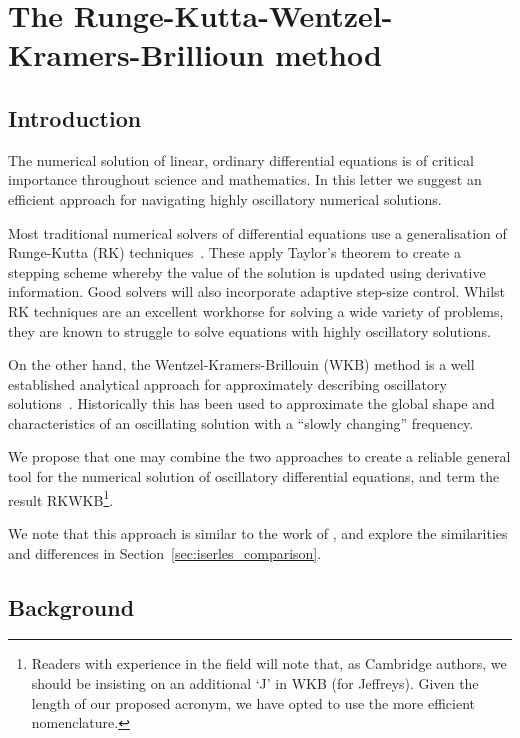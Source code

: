 

\chapter[RKWKB]{The Runge-Kutta-Wentzel-Kramers-Brillioun method}
\label{chap:RK}

\section{Introduction}
\label{sec:introduction}
The numerical solution of linear, ordinary differential equations is of critical importance throughout science and mathematics. In this letter we suggest an efficient approach for navigating highly oscillatory numerical solutions.

Most traditional numerical solvers of differential equations use a generalisation of Runge-Kutta (RK) techniques~\citep{Press+2007}. These apply Taylor's theorem to create a stepping scheme whereby the value of the solution is updated using derivative information. Good solvers will also incorporate adaptive step-size control.
Whilst RK techniques are an excellent workhorse for solving a wide variety of problems, they are known to struggle to solve equations with highly oscillatory solutions.

On the other hand, the Wentzel-Kramers-Brillouin (WKB) method is a well established analytical approach for approximately describing oscillatory solutions~\citep{RHB,Bender+2010}. Historically this has been used to approximate the global shape and characteristics of an oscillating solution with a ``slowly changing'' frequency.

We propose that one may combine the two approaches to create a reliable general tool for the numerical solution of oscillatory differential equations, and term the result RKWKB\footnote{Readers with experience in the field will note that, as Cambridge authors, we should be insisting on an additional `J' in WKB (for Jeffreys). Given the length of our proposed acronym, we have opted to use the more efficient nomenclature.}.

We note that this approach is similar to the work of \cite{Iserles02globalerror,Iserles01thinkglobally}, and explore the similarities and differences in Section~\ref{sec:iserles_comparison}.


\section{Background}
